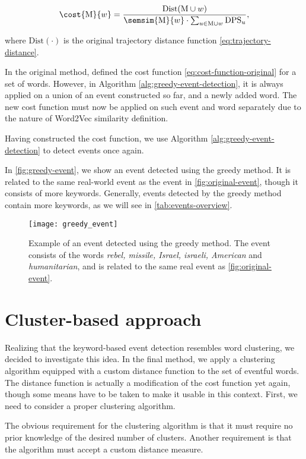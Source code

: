 \begin{equation} \label{eq:cost-function}
	\cost{\featset}{w} = \frac{\text{Dist}( \featset \cup w )}{\semsim{\featset}{w} \cdot \sum_{u \in \featset \cup w}{\text{DPS}_{u}}},
\end{equation}

where $\text{Dist}(\cdot)$ is the original trajectory distance function \eqref{eq:trajectory-distance}.

In the original method, \cite{event-detection} defined the cost function \eqref{eq:cost-function-original} for a set of words. However, in Algorithm \ref{alg:greedy-event-detection}, it is always applied on a union of an event constructed so far, and a newly added word. The new cost function must now be applied on such event and word separately due to the nature of Word2Vec similarity definition.

Having constructed the cost function, we use Algorithm \ref{alg:greedy-event-detection} to detect events once again.

In \autoref{fig:greedy-event}, we show an event detected using the greedy method. It is related to the same real-world event as the event in \autoref{fig:original-event}, though it consists of more keywords. Generally, events detected by the greedy method contain more keywords, as we will see in \autoref{tab:events-overview}.

\begin{figure}
  \centering
  \texttt{[image: greedy\_event]}  %
  \caption{Example of an event detected using the greedy method. The event consists of the words \textit{rebel, missile, Israel, israeli, American} and \textit{humanitarian}, and is related to the same real event as \autoref{fig:original-event}.}
  \label{fig:greedy-event}
\end{figure}


\section{Cluster-based approach}
Realizing that the keyword-based event detection resembles word clustering, we decided to investigate this idea. In the final method, we apply a clustering algorithm equipped with a custom distance function to the set of eventful words. The distance function is actually a modification of the cost function yet again, though some means have to be taken to make it usable in this context. First, we need to consider a proper clustering algorithm.

The obvious requirement for the clustering algorithm is that it must require no prior knowledge of the desired number of clusters. Another requirement is that the algorithm must accept a custom distance measure.

